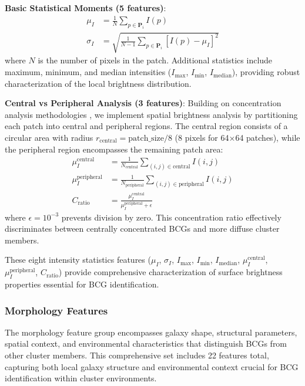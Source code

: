 \documentclass[twocolumn,10pt]{aastex631}
\begin{document}
\textbf{Basic Statistical Moments (5 features)}:
\begin{align}
\mu_I &= \frac{1}{N} \sum_{p \in \mathbf{P}_i} I(p) \\
\sigma_I &= \sqrt{\frac{1}{N-1} \sum_{p \in \mathbf{P}_i} [I(p) - \mu_I]^2}
\end{align}
where $N$ is the number of pixels in the patch. Additional statistics include maximum, minimum, and median intensities ($I_{\max}$, $I_{\min}$, $I_{\text{median}}$), providing robust characterization of the local brightness distribution.

\textbf{Central vs Peripheral Analysis (3 features)}: Building on concentration analysis methodologies \citep{Conselice2003}, we implement spatial brightness analysis by partitioning each patch into central and peripheral regions. The central region consists of a circular area with radius $r_{\text{central}} = \text{patch\_size}/8$ (8 pixels for 64×64 patches), while the peripheral region encompasses the remaining patch area:
\begin{align}
\mu_I^{\text{central}} &= \frac{1}{N_{\text{central}}} \sum_{(i,j) \in \text{central}} I(i,j) \\
\mu_I^{\text{peripheral}} &= \frac{1}{N_{\text{peripheral}}} \sum_{(i,j) \in \text{peripheral}} I(i,j) \\
C_{\text{ratio}} &= \frac{\mu_I^{\text{central}}}{\mu_I^{\text{peripheral}} + \epsilon}
\end{align}
where $\epsilon = 10^{-3}$ prevents division by zero. This concentration ratio effectively discriminates between centrally concentrated BCGs and more diffuse cluster members.

These eight intensity statistics features ($\mu_I$, $\sigma_I$, $I_{\max}$, $I_{\min}$, $I_{\text{median}}$, $\mu_I^{\text{central}}$, $\mu_I^{\text{peripheral}}$, $C_{\text{ratio}}$) provide comprehensive characterization of surface brightness properties essential for BCG identification.

\subsubsection{Morphology Features}

The morphology feature group encompasses galaxy shape, structural parameters, spatial context, and environmental characteristics that distinguish BCGs from other cluster members. This comprehensive set includes 22 features total, capturing both local galaxy structure and environmental context crucial for BCG identification within cluster environments.
\end{document}

